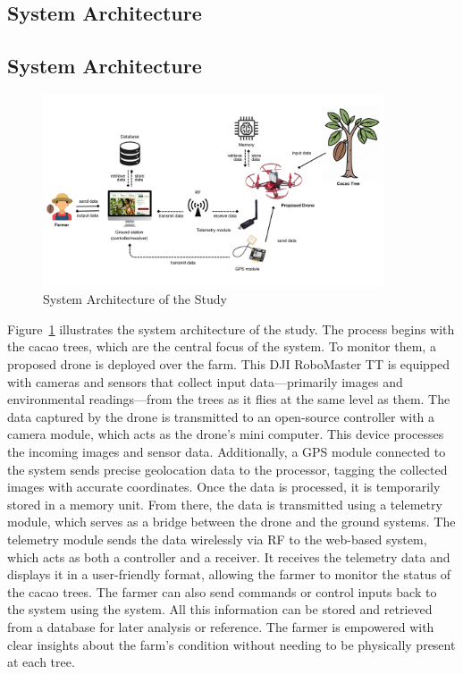 \subsection*{System Architecture}
\subsection{System Architecture}

\begin{figure}[H]
	\centering
	\caption{System Architecture of the Study}
	\label{fig:SysArch}
	\includegraphics[width=0.9\textwidth]{figures/Sys_Arch.pdf}
\end{figure}

Figure~\ref{fig:SysArch} illustrates the system architecture of the study. The process begins with the cacao trees, which are the central focus of the system. To monitor them, a proposed drone is deployed over the farm. This DJI RoboMaster TT is equipped with cameras and sensors that collect input data—primarily images and environmental readings—from the trees as it flies at the same level as them. The data captured by the drone is transmitted to an open-source controller with a camera module, which acts as the drone’s mini computer. This device processes the incoming images and sensor data. Additionally, a GPS module connected to the system sends precise geolocation data to the processor, tagging the collected images with accurate coordinates. Once the data is processed, it is temporarily stored in a memory unit. From there, the data is transmitted using a telemetry module, which serves as a bridge between the drone and the ground systems. The telemetry module sends the data wirelessly via RF to the web-based system, which acts as both a controller and a receiver. It receives the telemetry data and displays it in a user-friendly format, allowing the farmer to monitor the status of the cacao trees. The farmer can also send commands or control inputs back to the system using the system. All this information can be stored and retrieved from a database for later analysis or reference. The farmer is empowered with clear insights about the farm’s condition without needing to be physically present at each tree.

